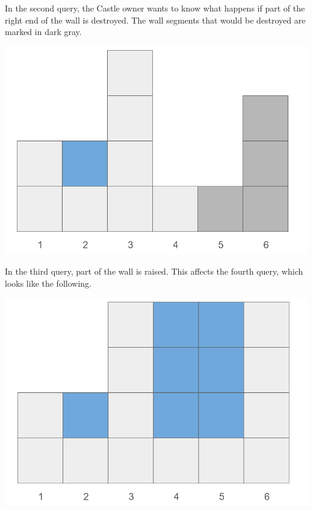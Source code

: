 In the second query, the Castle owner wants to know what happens if part of the right end of the wall is destroyed.
The wall segments that would be destroyed are marked in dark gray.

\begin{center}
  \includegraphics[scale=0.2]{mur3.png}
\end{center}

In the third query, part of the wall is raised. This affects the fourth query, which looks like the following.

\begin{center}
  \includegraphics[scale=0.2]{mur4.png}
\end{center} 